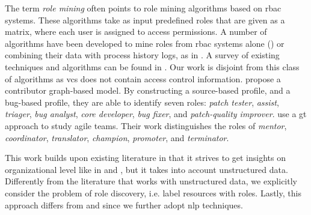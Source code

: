 The term \emph{role mining} often points to role mining algorithms based on \gls*{rbac} systems. These algorithms take as input predefined roles that are given as a matrix, where each user is assigned to access permissions. A number of algorithms have been developed to mine roles from \gls*{rbac} systems alone (\citealp{Lu2015,frank2013role}) or combining their data with process history logs, as in \cite{baumgrass2012deriving}. A survey of existing techniques and algorithms can be found in \cite{Mitra2016}. Our work is disjoint from this class of algorithms as \gls*{vcs} does not contain access control information. 
\cite{Bhattacharya2014} propose a contributor graph-based model. By constructing a source-based profile, and a bug-based profile, they are able to identify seven roles: \emph{patch tester}, \emph{assist}, \emph{triager}, \emph{bug analyst}, \emph{core developer}, \emph{bug fixer}, and \emph{patch-quality improver}. \cite{hoda2013self} use a \gls*{gt} approach to study agile teams. Their work distinguishes the roles of \emph{mentor}, \emph{coordinator}, \emph{translator}, \emph{champion}, \emph{promoter}, and \emph{terminator}.


This work builds upon existing literature in that it strives to get insights on organizational level like in \cite{rubin2007process} and \cite{Song2008}, but it takes into account unstructured data. Differently from the literature that works with unstructured data, we explicitly consider the problem of role discovery, i.e. label resources with roles. Lastly, this approach differs from \cite{Bhattacharya2014} and \cite{hoda2013self} since we further adopt \gls*{nlp} techniques.
